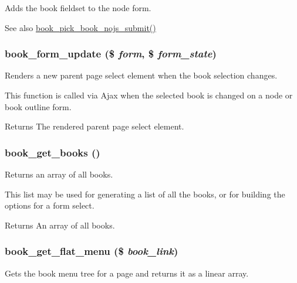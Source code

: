 Adds the book fieldset to the node form.

\begin{DoxySeeAlso}{See also}
\hyperlink{book_8module_af0244d9baf8107c2b7fff3478801f424}{book\_\-pick\_\-book\_\-nojs\_\-submit()} 
\end{DoxySeeAlso}
\hypertarget{book_8module_a2790b0d5752cf56b0e06bd2a16a380e1}{
\subsubsection[{book\_\-form\_\-update}]{\setlength{\rightskip}{0pt plus 5cm}book\_\-form\_\-update (\$ {\em form}, \/  \$ {\em form\_\-state})}}
\label{book_8module_a2790b0d5752cf56b0e06bd2a16a380e1}
Renders a new parent page select element when the book selection changes.

This function is called via Ajax when the selected book is changed on a node or book outline form.

\begin{DoxyReturn}{Returns}
The rendered parent page select element. 
\end{DoxyReturn}
\hypertarget{book_8module_ab209378421c9f070a4a12e819abf4316}{
\subsubsection[{book\_\-get\_\-books}]{\setlength{\rightskip}{0pt plus 5cm}book\_\-get\_\-books ()}}
\label{book_8module_ab209378421c9f070a4a12e819abf4316}
Returns an array of all books.

This list may be used for generating a list of all the books, or for building the options for a form select.

\begin{DoxyReturn}{Returns}
An array of all books. 
\end{DoxyReturn}
\hypertarget{book_8module_acf95f70abbeb522883dc96c8ccd9dd4d}{
\subsubsection[{book\_\-get\_\-flat\_\-menu}]{\setlength{\rightskip}{0pt plus 5cm}book\_\-get\_\-flat\_\-menu (\$ {\em book\_\-link})}}
\label{book_8module_acf95f70abbeb522883dc96c8ccd9dd4d}
Gets the book menu tree for a page and returns it as a linear array.


